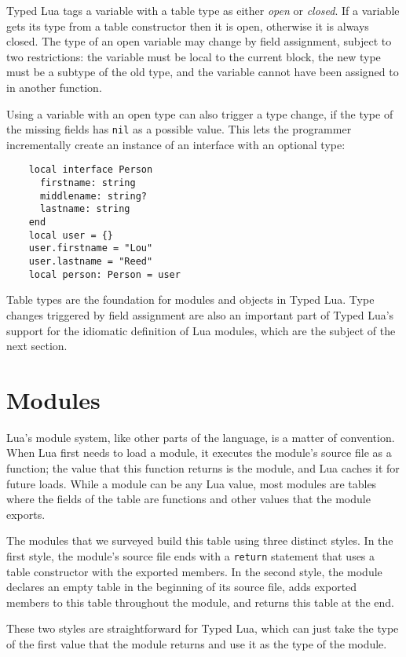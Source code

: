 \documentclass[preprint]{sig-alternate}
\begin{document}
Typed Lua tags a variable with a table type as either
{\em open} or {\em closed}. If a variable gets its type
from a table constructor then it is open, otherwise it is
always closed. The type of an open variable may change
by field assignment, subject to two restrictions: the
variable must be local to the current block, the new type
must be a subtype of the old type, and the variable
cannot have been assigned to in another function.

Using a variable with an open type can also trigger a
type change, if the type of the missing fields has
{\tt nil} as a possible value. This lets the programmer
incrementally create an instance of an interface with
an optional type:

\begin{verbatim}
    local interface Person
      firstname: string
      middlename: string?
      lastname: string
    end
    local user = {}
    user.firstname = "Lou"
    user.lastname = "Reed"
    local person: Person = user
\end{verbatim}

Table types are the foundation for modules and objects in
Typed Lua. Type changes triggered by field assignment are
also an important part of Typed Lua's support for the
idiomatic definition of Lua modules, which are the
subject of the next section.

\section{Modules}
\label{sec:modules}

Lua's module system, like other parts of the language, is
a matter of convention. When Lua first needs to load a
module, it executes the module's source file as a function;
the value that this function returns is the module, and Lua
caches it for future loads. While a module can be any
Lua value, most modules are tables where the fields
of the table are functions and other values that the
module exports.

The modules that we surveyed build this table using
three distinct styles. In the first style, the module's
source file ends
with a {\tt return} statement that uses a table constructor
with the exported members. In the second style, the
module declares an empty table in the beginning of its
source file, adds exported members to this table
throughout the module, and returns this table at the end.

These two styles are straightforward for Typed Lua, which
can just take the type of the first value that the module
returns and use it as the type of the module.
\end{document}
